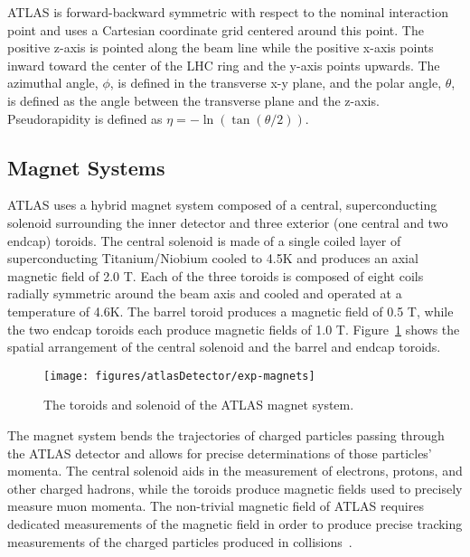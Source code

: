 ATLAS is forward-backward symmetric with respect to the nominal interaction point and uses a Cartesian coordinate grid centered around this point. The positive z-axis is pointed along the beam line while the positive x-axis points inward toward the center of the LHC ring and the y-axis points upwards. The azimuthal angle, $\phi$, is defined in the transverse x-y plane, and the polar angle, $\theta$, is defined as the angle between the transverse plane and the z-axis. Pseudorapidity is defined as $\eta=-\ln(\tan(\theta/2))$.

\subsection{Magnet Systems}
\label{sec:magnetSystem}
ATLAS uses a hybrid magnet system composed of a central, superconducting solenoid surrounding the inner detector and three exterior (one central and two endcap) toroids. The central solenoid is made of a single coiled layer of superconducting Titanium/Niobium cooled to 4.5K and produces an axial magnetic field of 2.0 T. Each of the three toroids is composed of eight coils radially symmetric around the beam axis and cooled and operated at a temperature of 4.6K. The barrel toroid produces a magnetic field of 0.5 T, while the two endcap toroids each produce magnetic fields of 1.0 T. Figure~\ref{fig:atlasMagnets} shows the spatial arrangement of the central solenoid and the barrel and endcap toroids.

\begin{figure}[h]
\centering
\texttt{[image: figures/atlasDetector/exp-magnets]}
\label{fig:atlasMagnets}
\caption{The toroids and solenoid of the ATLAS magnet system.}
\end{figure}

The magnet system bends the trajectories of charged particles passing through the ATLAS detector and allows for precise determinations of those particles' momenta. The central solenoid aids in the measurement of electrons, protons, and other charged hadrons, while the toroids produce magnetic fields used to precisely measure muon momenta. The non-trivial magnetic field of ATLAS requires dedicated measurements of the magnetic field in order to produce precise tracking measurements of the charged particles produced in collisions~\cite{1742-6596-110-9-092018}.

